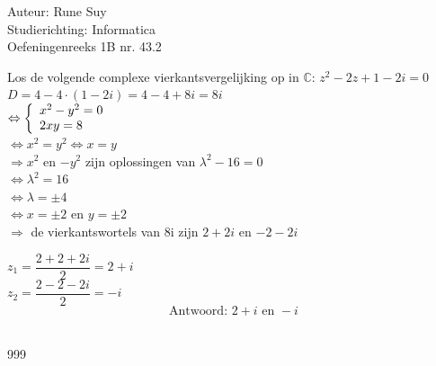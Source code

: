 \documentclass[a4paper]{article}
\begin{document}
  
\noindent \large Auteur: Rune Suy \\
\noindent \large Studierichting: Informatica\\
\noindent \large Oefeningenreeks 1B nr. 43.2\\

\medskip

\normalsize

Los de volgende complexe vierkantsvergelijking op in $\mathbb{C}$: $z^2-2z+1-2i=0$ \\

$ D = 4-4\cdot(1-2i) = 4-4+8i = 8i$ \\

$\Leftrightarrow \left \{ \\
\begin{array}{l}
    x^2 - y^2 = 0 \\
    2xy = 8 \\
\end{array} \\
\right . $\\

$\Leftrightarrow x^2 = y^2 \Leftrightarrow x=y $\\

$\Rightarrow x^2$ en $-y^2$ zijn oplossingen van $\lambda^2 - 16 = 0 $\\

$\Leftrightarrow \lambda^2 = 16$\\

$\Leftrightarrow \lambda = \pm 4$\\

$\Leftrightarrow x = \pm 2$ en $y = \pm 2$\\

$\Rightarrow$ de vierkantswortels van 8i zijn $2+2i$ en $-2-2i$\\

\bigskip

$ z_1 = \dfrac{2+2+2i}{2} = 2+i $\\

$ z_2 = \dfrac{2-2-2i}{2} = -i $\\

$$ \text{Antwoord: } 2+i \text{ en } -i $$\\

\begin{thebibliography}{999}
\end{thebibliography}
\end{document}
